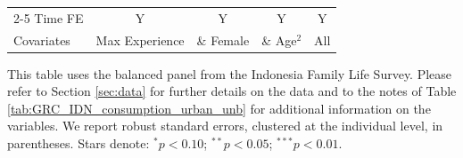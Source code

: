 \begin{table}[htbp]
\begin{threeparttable}
\begin{tabular}{l cccc}
\cmidrule{2-5} Time FE & Y & Y & Y & Y \\ Covariates & Max Experience & \& Female & \& Age$^2$ & All \\ \bottomrule \end{tabular} \begin{tablenotes}[flushleft] \footnotesize \item{This table uses the balanced panel from the Indonesia Family Life Survey. Please refer to Section \ref{sec:data} for further details on the data and to the notes of Table \ref{tab:GRC_IDN_consumption_urban_unb} for additional information on the variables. We report robust standard errors, clustered at the individual level, in parentheses. Stars denote: $^{*} p<0.10$; $^{**} p<0.05$; $^{***} p<0.01$.} \end{tablenotes} \end{threeparttable} \end{table}
